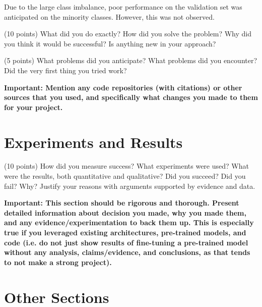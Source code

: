 \documentclass[10pt,twocolumn,letterpaper]{article}
\begin{document}
Due to the large class imbalance, poor performance on the validation set was anticipated on the minority classes. However, this was not observed.

(10 points) What did you do exactly? How did you solve the problem? Why did you think it would be successful? Is anything new in your approach? 

(5 points) What problems did you anticipate? What problems did you encounter? Did the very first thing you tried work? 

\textbf{Important: Mention any code repositories (with citations) or other sources that you used, and specifically what changes you made to them for your project. }

\section{Experiments and Results}

(10 points) How did you measure success? What experiments were used? What were the results, both quantitative and qualitative? Did you succeed? Did you fail? Why? Justify your reasons with arguments supported by evidence and data.

\textbf{Important: This section should be rigorous and thorough. Present detailed information about decision you made, why you made them, and any evidence/experimentation to back them up. This is especially true if you leveraged existing architectures, pre-trained models, and code (i.e. do not just show results of fine-tuning a pre-trained model without any analysis, claims/evidence, and conclusions, as that tends to not make a strong project). }

\section{Other Sections}
\end{document}
